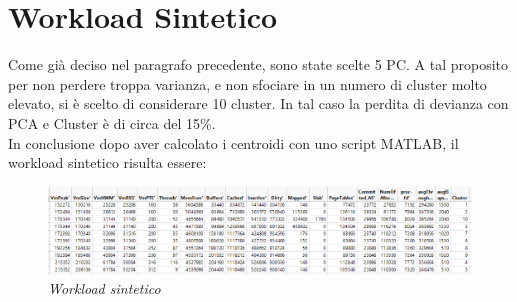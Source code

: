 \section{Workload Sintetico}
Come già deciso nel paragrafo precedente, sono state scelte 5 PC. A tal proposito per non perdere troppa varianza, e non sfociare in un numero di cluster molto elevato, si è scelto di considerare 10 cluster. In tal caso la perdita di devianza con PCA e Cluster è di circa del 15\%.
\\In conclusione dopo aver calcolato i centroidi con uno script MATLAB, il workload sintetico risulta essere:
\begin{figure}[H]
	\centering
	\includegraphics[width=\textwidth]{img/hw1/workload_sintetico.png}
	\caption{\textit{Workload sintetico}}
\end{figure}